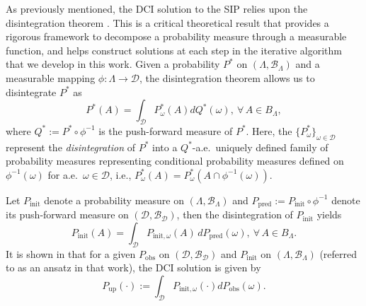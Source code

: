 \documentclass{article}
\newcommand{\B}{\mathcal{B}}
\newcommand{\pspace}{\Lambda}
\newcommand{\dspace}{\mathcal{D}}
\newcommand{\initmeas}{P_{\text{init}}}
\newcommand{\initmeasomega}{P_{\text{init}, \omega}}
\newcommand{\predictmeas}{P_\text{pred}}
\begin{document}
As previously mentioned, the DCI solution to the SIP relies upon the disintegration theorem \cite{changandpollard1997}. 
This is a critical theoretical result that provides a rigorous framework to decompose a probability measure through a measurable function, and helps construct solutions at each step in the iterative algorithm that we develop in this work. 
Given a probability $P^*$ on $(\Lambda,\B_{\Lambda})$ and a measurable mapping $\phi: \Lambda \rightarrow \mathcal{D}$, the disintegration theorem allows us to disintegrate $P^*$ as
\begin{equation} \label{disintegration}
    P^*(A) = \int_{\mathcal{D}}P^*_{\omega}(A) dQ^{*}(\omega), \ \forall \, A\in B_\Lambda,
\end{equation}
where $Q^{*}:= P^{*}\circ\phi^{-1}$ is the push-forward measure of $P^*$.
Here, the $\{P^*_\omega\}_{\omega \in \mathcal{D}}$ represent the {\em disintegration} of $P^*$ into a $Q^*$-a.e.~uniquely defined family of probability measures representing conditional probability measures defined on $\phi^{-1}(\omega)$ for a.e.~$\omega\in\mathcal{D}$, i.e., $P^*_\omega(A) = P^*_\omega(A\cap \phi^{-1}(\omega))$.

Let $\initmeas$ denote a probability measure on $(\Lambda,\B_\Lambda)$ and $\predictmeas:=\initmeas\circ \phi^{-1}$ denote its push-forward measure on $(\mathcal{D}, \B_\dspace)$, then the disintegration of $\initmeas$ yields
\begin{equation}\label{eq:disintegrate_initial}
    \initmeas(A) = \int_\dspace \initmeasomega(A)\, d\predictmeas(\omega), \ \forall \, A\in B_\pspace.
\end{equation}
It is shown in \cite{BET+14} that for a given $P_\text{obs}$ on $(\mathcal{D},\B_\mathcal{D})$ and $P_\text{init}$ on $(\Lambda,\B_\Lambda)$ (referred to as an ansatz in that work), the DCI solution is given by 
\begin{equation} \label{integration}
    P_\text{up}(\cdot) := \int_{\mathcal{D}} P_{\text{init}, \omega}(\cdot) dP_\text{obs}(\omega).   
\end{equation}
\end{document}
